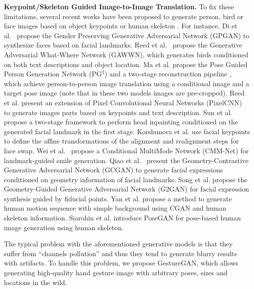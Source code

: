 \documentclass[sigconf]{acmart}
\begin{document}
\noindent\textbf{Keypoint/Skeleton Guided Image-to-Image Translation.}
To fix these limitations, several recent works have been proposed to generate person, bird or face images based on object keypoints \cite{reed2016learning,ma2017pose} or human skeleton \cite{yan2017skeleton,siarohin2017deformable}.
For instance,
Di et al.~\cite{di2017gp} propose the Gender Preserving Generative Adversarial Network (GPGAN) to synthesize faces based on facial landmarks.
Reed et al.~\cite{reed2016learning} propose the Generative Adversarial What-Where Network (GAWWN), which generates birds conditioned on both text descriptions and object location.
Ma et al. propose the Pose Guided Person Generation Network (PG$^2$) \cite{ma2017pose} and a two-stage reconstruction pipeline \cite{ma2017disentangled}, which achieve person-to-person image translation using a conditional image and a target pose image (note that in these two models images are pre-cropped).
Reed et al. \cite{reed2016generating} present an extension of Pixel Convolutional Neural Networks (PixelCNN) to generate images parts based on keypoints and text description.
Sun et al. \cite{sun2017natural} propose a two-stage framework to  perform head inpainting conditioned on the generated facial landmark in the first stage.
Korshunova et al. \cite{korshunova2016fast} use facial keypoints to define the affine transformations of the alignment and realignment steps for face swap. 
Wei et al.~\cite{wei2017every} propose a Conditional MultiMode Network (CMM-Net) for landmark-guided  smile generation.
Qiao et al.~\cite{qiao2018geometry} present the Geometry-Contrastive Generative Adversarial Network (GCGAN) to generate facial expressions conditioned on geometry information of facial landmarks. 
Song et al. \cite{song2017geometry} propose the Geometry-Guided Generative Adversarial Network (G2GAN) for facial expression synthesis guided by fiducial points.
Yan et al. \cite{yan2017skeleton} propose a method to generate human motion sequence with simple background using CGAN and human skeleton information.
Siarohin et al. \cite{siarohin2017deformable} introduce PoseGAN for pose-based human image generation using human skeleton.

The typical problem with the aforementioned generative models is that they suffer from ``channels pollution'' and thus
they tend to generate blurry results with artifacts.
To handle this problem, we propose GestureGAN, which allows generating high-quality hand gesture image with arbitrary poses, sizes and locations in the wild.
\end{document}
